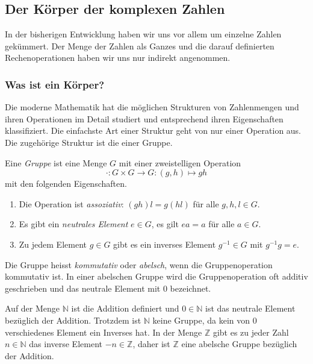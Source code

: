 %
%
%
\subsection{Der Körper der komplexen Zahlen}
In der bisherigen Entwicklung haben wir uns vor allem um einzelne
Zahlen gekümmert.
Der Menge der Zahlen als Ganzes und die darauf definierten 
Rechenoperationen haben wir uns nur indirekt angenommen.

%
%
\subsubsection{Was ist ein Körper?}
Die moderne Mathematik hat die möglichen Strukturen von Zahlenmengen und
ihren Operationen im Detail studiert und entsprechend ihren Eigenschaften
klassifiziert.
Die einfachste Art einer Struktur geht von nur einer Operation aus.
Die zugehörige Struktur ist die einer Gruppe.

\begin{definition}[Gruppe]
Eine \emph{Gruppe} ist eine Menge $G$ mit einer zweistelligen Operation
%
\[
\cdot
:
G\times G \to G
:
(g,h) \mapsto gh
\]
mit den folgenden Eigenschaften.
\begin{enumerate}
\item
Die Operation ist \emph{assoziativ}: $(gh)l = g(hl)$ für alle $g,h,l\in G$.
%
\item
Es gibt ein \emph{neutrales Element} $e\in G$, es gilt $ea=a$ für alle $a\in G$.
%
%
\item
Zu jedem Element $g\in G$ gibt es ein inverses Element $g^{-1}\in G$
mit $g^{-1}g=e$.
\end{enumerate}
Die Gruppe heisst \emph{kommutativ}
%
%
oder \emph{abelsch},
%
wenn die Gruppenoperation kommutativ ist.
In einer abelschen Gruppe wird die Gruppenoperation oft additiv geschrieben
und das neutrale Element mit $0$ bezeichnet.
\end{definition}

\begin{beispiel}
Auf der Menge $\mathbb{N}$ ist die Addition definiert und $0\in\mathbb{N}$ 
%
ist das neutrale Element bezüglich der Addition.
Trotzdem ist $\mathbb{N}$ keine Gruppe, da kein von 0 verschiedenes Element
ein Inverses hat.
In der Menge $\mathbb{Z}$ gibt es zu jeder Zahl $n\in\mathbb{N}$ das
%
inverse Element $-n\in\mathbb{Z}$, daher ist $\mathbb{Z}$ eine
abelsche Gruppe bezüglich der Addition.
\end{beispiel}

